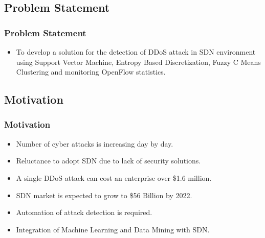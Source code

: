 \documentclass[10pt]{beamer}
\begin{document}
\begin{frame}
\section[]{Problem Statement}
\frametitle{Problem Statement}
\begin{itemize}
\footnotesize
\item
To develop a solution for the detection of DDoS attack in SDN environment using Support Vector Machine, Entropy Based Discretization, Fuzzy C Means Clustering and monitoring OpenFlow statistics.
\end{itemize}
\end{frame}




\begin{frame}
\section[]{Motivation}
\frametitle{Motivation}
\begin{center}
\begin{itemize}
\footnotesize
\item 
Number of cyber attacks is increasing day by day.
\item
Reluctance to adopt SDN due to lack of security solutions.
\item
A single DDoS attack can cost an enterprise over \$1.6 million.
\item
SDN market is expected to grow to \$56 Billion by 2022.
\item
Automation of attack detection is required.
\item
Integration of Machine Learning and Data Mining with SDN. 
\end{itemize}
\end{center}

\end{frame}
\end{document}
